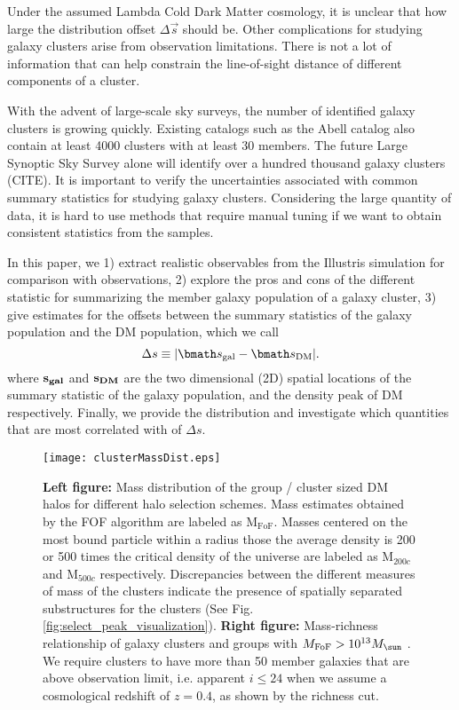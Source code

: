 Under the assumed Lambda Cold Dark Matter cosmology, it is unclear 
that how large the distribution offset $\Delta \vec{s}$ should be. 
Other complications for studying galaxy clusters arise from observation
limitations. There is not a lot of information that can help constrain the  
line-of-sight distance of different components of a cluster. 


With the advent of large-scale sky surveys, 
the number of identified galaxy clusters is growing quickly. 
Existing catalogs such as the Abell catalog also contain
at least 4000 clusters with at least 30 members. 
The future Large Synoptic Sky Survey alone will identify over a hundred thousand galaxy
clusters (CITE). It is important to verify the uncertainties associated with common
summary statistics for studying galaxy clusters. Considering the large quantity
of data, it is hard to use methods that require manual tuning if we want to
obtain consistent statistics from the samples.

In this paper, we 
1) extract realistic observables from the Illustris simulation for
comparison with observations, 2) explore the pros and cons of the different statistic for 
summarizing the member galaxy population of a galaxy cluster, 3)	
give estimates for the offsets between the summary statistics of the galaxy  
population and the DM population, which we call 
\begin{equation}
	\Delta s \equiv |\vec{s}_{\rm gal} - \vec{s}_{\rm DM}|.
\end{equation}
where $\bf{s}_{gal}$ and $\bf{s}_{DM}$ are the two dimensional (2D) spatial
locations of the summary statistic of the galaxy population, and the density
peak of DM respectively. 
Finally, we provide the distribution and investigate which quantities that are most
correlated with of $\Delta s$.

\begin{figure*}
	\texttt{[image: clusterMassDist.eps]}
	\caption{ {\bf Left figure:} Mass distribution of the group / cluster sized 
		DM halos for different halo selection schemes. Mass estimates obtained by the
		FOF algorithm are labeled as  M$_{\text{FoF}}$.
		Masses centered on the most bound particle within a radius those the 
		average density is 200 or 500 times the critical density of the universe are 
		labeled as M$_{200c}$ and M$_{500c}$ respectively. 
		Discrepancies between the different
		measures of mass of the clusters indicate the presence of spatially
		separated substructures for the clusters (See Fig. 
		\ref{fig:select_peak_visualization}). {\bf Right figure:} 
		Mass-richness relationship of galaxy clusters and groups with 
		$M_{\rm FoF} > 10^{13} M_{\sun}$ . We require clusters to have more than 50 member 
		galaxies that are above observation limit, i.e. apparent $i \leq 24$ when 
		we assume a cosmological redshift
of $z=0.4$, as shown by the richness cut. \label{fig:mass_richness}}
\end{figure*}

